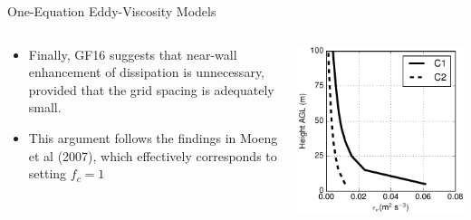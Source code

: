 \begin{frame}{One-Equation Eddy-Viscosity Models}
  
\setlength{\fboxsep}{0pt}
\setlength{\fboxrule}{1pt}
\begin{columns}[T]
    \begin{column}{.45\textwidth}
    \begin{itemize}
    	\item Finally, GF16 suggests that near-wall enhancement of dissipation is unnecessary, provided that the grid spacing is adequately small.
	\item This argument follows the findings in Moeng et al (2007), which effectively corresponds to setting $f_c=1$
    \end{itemize}
    \end{column}
    \begin{column}{.55\textwidth}
    \begin{minipage}[c][.6\textheight][c]{\linewidth}
      \includegraphics[width=\textwidth]{dissipation.pdf}
      \end{minipage}
    \end{column}
  \end{columns}
  
\end{frame}


